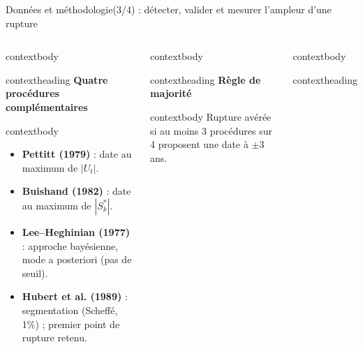 \documentclass[aspectratio=169,11pt]{beamer}
\begin{document}
\begin{frame}{Données et méthodologie(3/4) : détecter, valider et mesurer l’ampleur d’une rupture}
  \small
  \begin{columns}[T,onlytextwidth]
      \begin{beamercolorbox}[wd=\linewidth,rounded=true,sep=0pt]{contextbody}
        \begin{beamercolorbox}[wd=\linewidth,ht=0.42cm,dp=0.08cm,leftskip=0.16cm]{contextheading}
          \bfseries Quatre procédures complémentaires
        \end{beamercolorbox}
        \begin{beamercolorbox}[wd=\linewidth,sep=0.10cm]{contextbody}
          \footnotesize
          \begin{itemize}
            \setlength\itemsep{0.07cm}
            \item \textbf{Pettitt (1979)} : date au maximum de $|U_t|$.
            \item \textbf{Buishand (1982)} : date au maximum de $|S_k^*|$.
            \item \textbf{Lee--Heghinian (1977)} : approche bayésienne, mode a posteriori (pas de seuil).
            \item \textbf{Hubert et al. (1989)} : segmentation (Scheffé, 1\%) ; premier point de rupture retenu.
          \end{itemize}
        \end{beamercolorbox}
      \end{beamercolorbox}
      \begin{beamercolorbox}[wd=\linewidth,rounded=true,sep=0pt]{contextbody}
        \begin{beamercolorbox}[wd=\linewidth,ht=0.42cm,dp=0.08cm,leftskip=0.16cm]{contextheading}
          {\color{marine}\bfseries Règle de majorité}
        \end{beamercolorbox}
        \begin{beamercolorbox}[wd=\linewidth,sep=0.10cm]{contextbody}
          \small
          Rupture \textcolor{marine}{avérée} si au moins 3 procédures sur 4 proposent une date à $\pm 3$ ans.
        \end{beamercolorbox}
      \end{beamercolorbox}
      \vspace{0.14cm}
      \begin{beamercolorbox}[wd=\linewidth,rounded=true,sep=0pt]{contextbody}
        \begin{beamercolorbox}[wd=\linewidth,ht=0.42cm,dp=0.08cm,leftskip=0.16cm]{contextheading}

\end{beamercolorbox}
\end{beamercolorbox}
\end{columns}
\end{frame}
\end{document}
